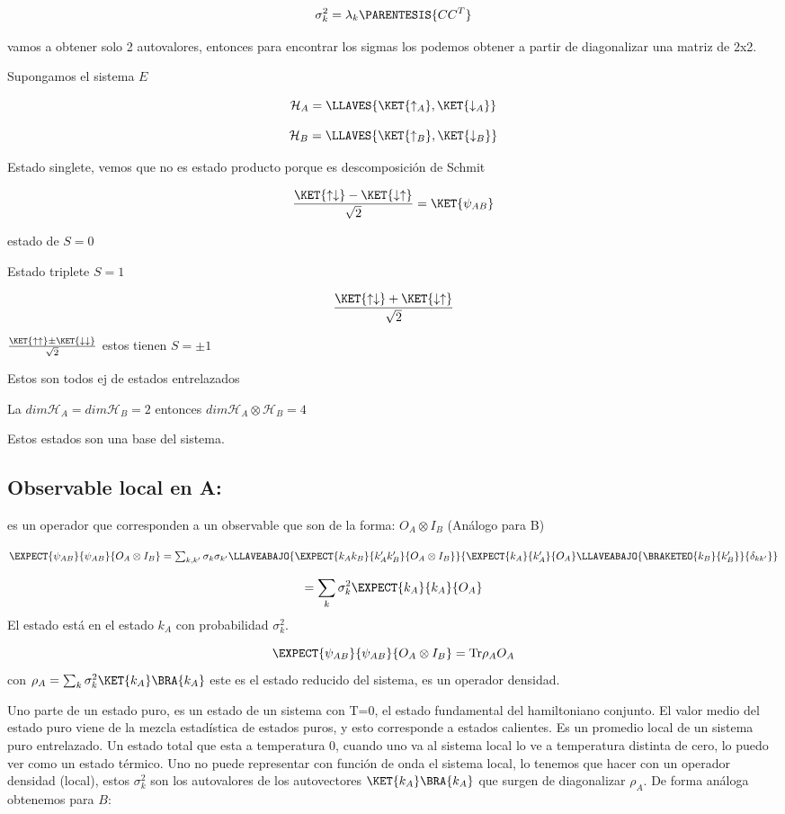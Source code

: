 \[
\sigma_{k}^{2}=\lambda_{k}\PARENTESIS{CC^{T}}
\]

vamos a obtener solo 2 autovalores, entonces para encontrar los sigmas
los podemos obtener a partir de diagonalizar una matriz de 2x2.

Supongamos el sistema $E$

\[
\mathcal{H}_{A}=\LLAVES{\KET{\uparrow_{A}},\KET{\downarrow_{A}}}
\]

\[
\mathcal{H}_{B}=\LLAVES{\KET{\uparrow_{B}},\KET{\downarrow_{B}}}
\]

Estado singlete, vemos que no es estado producto porque es descomposición
de Schmit

\[
\frac{\KET{\uparrow\downarrow}-\KET{\downarrow\uparrow}}{\sqrt{2}}=\KET{\psi_{AB}}
\]

estado de $S=0$

Estado triplete $S=1$

\[
\frac{\KET{\uparrow\downarrow}+\KET{\downarrow\uparrow}}{\sqrt{2}}
\]

$\frac{\KET{\uparrow\uparrow}\pm\KET{\downarrow\downarrow}}{\sqrt{2}}$
estos tienen $S=\pm1$

Estos son todos ej de estados entrelazados

La $dim\mathcal{H}_{A}=dim\mathcal{H}_{B}=2$ entonces $dim\mathcal{H}_{A}\otimes\mathcal{H}_{B}=4$

Estos estados son una base del sistema.

\subsection{Observable local en A: }

es un operador que corresponden a un observable que son de la forma:
$O_{A}\otimes I_{B}$ (Análogo para B)

$\EXPECT{\psi_{AB}}{\psi_{AB}}{O_{A}\otimes I_{B}}=\sum_{k,k'}\sigma_{k}\sigma_{k'}\LLAVEABAJO{\EXPECT{k_{A}k_{B}}{k_{A}'k'_{B}}{O_{A}\otimes I_{B}}}{\EXPECT{k_{A}}{k'_{A}}{O_{A}}\LLAVEABAJO{\BRAKETEO{k_{B}}{k'_{B}}}{\delta_{kk'}}}$

\[
=\sum_{k}\sigma_{k}^{2}\EXPECT{k_{A}}{k_{A}}{O_{A}}
\]
El estado está en el estado $k_{A}$ con probabilidad $\sigma_{k}^{2}$.

\[
\EXPECT{\psi_{AB}}{\psi_{AB}}{O_{A}\otimes I_{B}}=\text{Tr}\rho_{A}O_{A}
\]
 con $\rho_{A}=\sum_{k}\sigma_{k}^{2}\KET{k_{A}}\BRA{k_{A}}$ este
es el estado reducido del sistema, es un operador densidad.

Uno parte de un estado puro, es un estado de un sistema con T=0, el
estado fundamental del hamiltoniano conjunto. El valor medio del estado
puro viene de la mezcla estadística de estados puros, y esto corresponde
a estados calientes. Es un promedio local de un sistema puro entrelazado.
Un estado total que esta a temperatura 0, cuando uno va al sistema
local lo ve a temperatura distinta de cero, lo puedo ver como un estado
térmico. Uno no puede representar con función de onda el sistema local,
lo tenemos que hacer con un operador densidad (local), estos $\sigma_{k}^{2}$
son los autovalores de los autovectores $\KET{k_{A}}\BRA{k_{A}}$
que surgen de diagonalizar $\rho_{A}$. De forma análoga obtenemos
para $B$:


